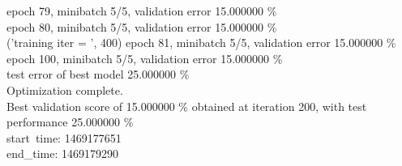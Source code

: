 \documentclass[a4paper]{article}
\begin{document}
epoch 79, minibatch 5/5, validation error 15.000000 \% \\
epoch 80, minibatch 5/5, validation error 15.000000 \% \\
('training \@ iter = ', 400)
epoch 81, minibatch 5/5, validation error 15.000000 \% \\ 
epoch 100, minibatch 5/5, validation error 15.000000 \% \\
 test error of best model 25.000000 \% \\
Optimization complete.\\
Best validation score of 15.000000 \% obtained at iteration 200, with test performance 25.000000 \% \\
start\ time: 1469177651 \\
end\_time: 1469179290 \\
\end{document}
